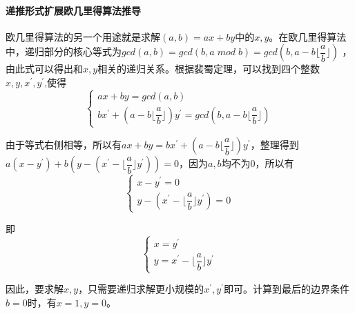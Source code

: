 \documentclass[UTF8,a4paper,11pt]{ctexart}
\begin{document}
\paragraph{递推形式扩展欧几里得算法推导}
	\indent \;
	\par 欧几里得算法的另一个用途就是求解$(a,b)=ax+by$中的$x,y$。在欧几里得算法中，递归部分的核心等式为$gcd(a,b)=gcd(b,a\; mod \; b)=gcd(b,a-b\lfloor \dfrac{a}{b}\rfloor)$ ，由此式可以得出和$x,y$相关的递归关系。根据裴蜀定理，可以找到四个整数$x,y,x^{\prime},y^{\prime}$,使得\\
	$$
		\left\{
			\begin{array}{lr}
			ax+by=gcd(a,b)\\
			bx^{\prime}+(a-b\lfloor\dfrac{a}{b}\rfloor)y^{\prime}=gcd(b,a-b\lfloor\dfrac{a}{b}\rfloor)
			\end{array}
		\right.
	$$
	\par 由于等式右侧相等，所以有$ax+by=bx^{\prime}+(a-b\lfloor\dfrac{a}{b}\rfloor)y^{\prime}$，整理得到$a(x-y^{\prime})+b(y-(x^{\prime}-\lfloor\dfrac{a}{b}\rfloor y^{\prime}))=0$，因为$a,b$均不为0，所以有\\
	$$
		\left\{
			\begin{array}{lr}
			x-y^{\prime}=0\\
			y-(x^{\prime}-\lfloor\dfrac{a}{b}\rfloor y^{\prime})=0
			\end{array}
		\right.
	$$
	\par 即\\

	$$
		\left\{
			\begin{array}{lr}
			x=y^{\prime}\\
			y=x^{\prime}-\lfloor\dfrac{a}{b}\rfloor y^{\prime}
			\end{array}
		\right.
	$$

	\par 因此，要求解$x,y$，只需要递归求解更小规模的$x^{\prime},y^{\prime}$即可。计算到最后的边界条件$b=0$时，有$x=1,y=0$。
\end{document}
